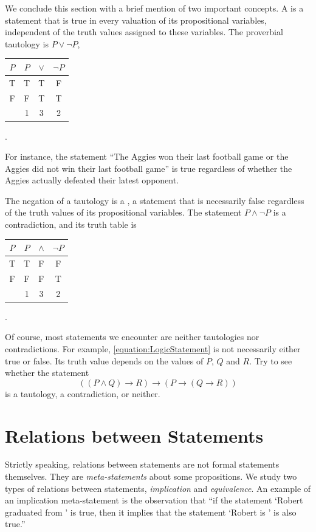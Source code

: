 We conclude this section with a brief mention of two important concepts.
A  is a statement that is true in every valuation of its propositional variables, independent of the truth values assigned to these variables.
The proverbial tautology is $P \vee \neg P$,
\begin{center}
\begin{tabular}{|c|c:c:c|}
\hline
$P$ & $P$ & $\vee$ & $\neg P$ \tabularnewline
\hline
T & T & T & F \tabularnewline
F & F & T & T \tabularnewline
& 1 & 3 & 2 \tabularnewline
\hline
\end{tabular} .
\end{center}
For instance, the statement ``The Aggies won their last football game or the Aggies did not win their last football game'' is true regardless of whether the Aggies actually defeated their latest opponent.

The negation of a tautology is a , a statement that is necessarily false regardless of the truth values of its propositional variables.
The statement $P \wedge \neg P$ is a contradiction, and its truth table is
\begin{center}
\begin{tabular}{|c|c:c:c|}
\hline
$P$ & $P$ & $\wedge$ & $\neg P$ \tabularnewline
\hline
T & T & F & F \tabularnewline
F & F & F & T \tabularnewline
& 1 & 3 & 2 \tabularnewline
\hline
\end{tabular} .
\end{center}

Of course, most statements we encounter are neither tautologies nor contradictions.
For example, \eqref{equation:LogicStatement} is not necessarily either true or false.
Its truth value depends on the values of $P$, $Q$ and $R$.
Try to see whether the statement
\begin{equation*}
((P \wedge Q) \rightarrow R) \rightarrow (P \rightarrow (Q \rightarrow R))
\end{equation*}
is a tautology, a contradiction, or neither.


\section{Relations between Statements}
\label{section:Relations}

Strictly speaking, relations between statements are not formal statements themselves.
They are \emph{meta-statements} about some propositions.
We study two types of relations between statements, \emph{implication} and \emph{equivalence}.
An example of an implication meta-statement is the observation that ``if the statement `Robert graduated from \univ' is true, then it implies that the statement `Robert is \mascot' is also true.''

